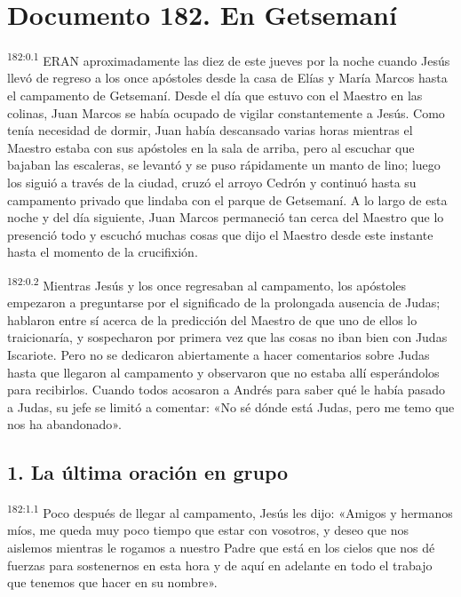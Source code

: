 \chapter{Documento 182. En Getsemaní}
\par
\textsuperscript{182:0.1} ERAN aproximadamente las diez de este jueves por la noche cuando Jesús llevó de regreso a los once apóstoles desde la casa de Elías y María Marcos hasta el campamento de Getsemaní. Desde el día que estuvo con el Maestro en las colinas, Juan Marcos se había ocupado de vigilar constantemente a Jesús. Como tenía necesidad de dormir, Juan había descansado varias horas mientras el Maestro estaba con sus apóstoles en la sala de arriba, pero al escuchar que bajaban las escaleras, se levantó y se puso rápidamente un manto de lino; luego los siguió a través de la ciudad, cruzó el arroyo Cedrón y continuó hasta su campamento privado que lindaba con el parque de Getsemaní. A lo largo de esta noche y del día siguiente, Juan Marcos permaneció tan cerca del Maestro que lo presenció todo y escuchó muchas cosas que dijo el Maestro desde este instante hasta el momento de la crucifixión.

\par
\textsuperscript{182:0.2} Mientras Jesús y los once regresaban al campamento, los apóstoles empezaron a preguntarse por el significado de la prolongada ausencia de Judas; hablaron entre sí acerca de la predicción del Maestro de que uno de ellos lo traicionaría, y sospecharon por primera vez que las cosas no iban bien con Judas Iscariote. Pero no se dedicaron abiertamente a hacer comentarios sobre Judas hasta que llegaron al campamento y observaron que no estaba allí esperándolos para recibirlos. Cuando todos acosaron a Andrés para saber qué le había pasado a Judas, su jefe se limitó a comentar: «No sé dónde está Judas, pero me temo que nos ha abandonado».

\section*{1. La última oración en grupo}
\par
\textsuperscript{182:1.1} Poco después de llegar al campamento, Jesús les dijo: «Amigos y hermanos míos, me queda muy poco tiempo que estar con vosotros, y deseo que nos aislemos mientras le rogamos a nuestro Padre que está en los cielos que nos dé fuerzas para sostenernos en esta hora y de aquí en adelante en todo el trabajo que tenemos que hacer en su nombre».


